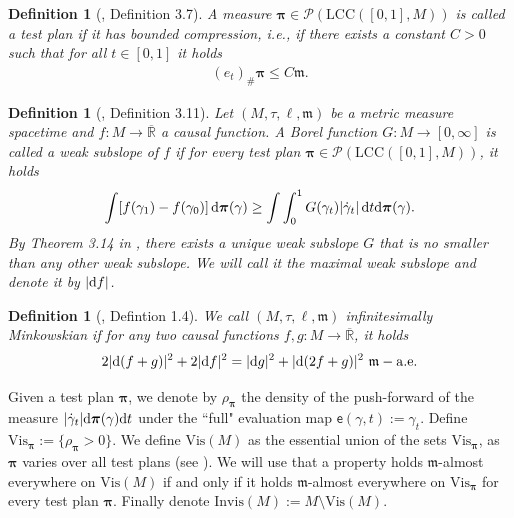 \documentclass[a4paper,10pt]{article}
\newtheorem{definition}[theorem]{Definition}
\numberwithin{equation}{section}
\newcommand{\R}{\mathbb{R}}
\newcommand{\di}{{\rm d}}
\begin{document}
\begin{definition}[\cite{beran2024nonlinear}, Definition 3.7]
    A measure $\boldsymbol{\pi} \in \mathcal{P}(\mathrm{LCC}([0,1], M))$ is called a \emph{test plan} if it has bounded compression, i.e., if there exists a constant $C>0$ such that for all $t \in [0,1]$ it holds 
    \begin{align*}
        (e_t)_\#\boldsymbol{\pi} \leq C \mathfrak{m}. 
    \end{align*}
\end{definition}

\smallskip
\begin{definition}[\cite{beran2024nonlinear}, Definition 3.11]\label{def:subslope}
    Let $(M, \tau, \ell, \mathfrak{m})$ be a metric measure spacetime and $f\colon M \to \overline{\R}$ a causal function. A Borel function $G\colon M \to [0, \infty]$ is called a \emph{weak subslope} of $f$ if for every test plan $\boldsymbol{\pi} \in \mathcal{P}(\mathrm{LCC}([0,1], M))$, it holds
    \begin{align}
        \int [f(\gamma_1)-f(\gamma_0)]\, \di \boldsymbol{\pi}(\gamma) \geq \int \int_0^1 G(\gamma_t)|\dot{\gamma}_t|\, \di t \di \boldsymbol{\pi}(\gamma).
    \end{align}
    By Theorem 3.14 in \cite{beran2024nonlinear}, there exists a unique weak subslope $G$ that is no smaller than any other weak subslope. We will call it the \emph{maximal weak subslope} and denote it by $|\di f|$.
\end{definition}

\smallskip
\begin{definition}[\cite{beran2024nonlinear}, Defintion 1.4]
    We call $(M,\tau, \ell, \mathfrak{m})$ \emph{infinitesimally Minkowskian} if for any two causal functions $f, g\colon  M \to \overline{\R}$, it holds
    \begin{align}\label{def:infinitesimal_minkowskianity}
        2|\di(f+g)|^2+ 2|\di f|^2 = |\di g|^2 + |\di (2f+g)|^2 \ \mathfrak{m}-\mathrm{a.e.}
    \end{align}
\end{definition}
Given a test plan $\boldsymbol{\pi}$, we denote by $\rho_{\boldsymbol{\pi}}$ the density of the push-forward of the measure $|\dot{\gamma}_t|\di\boldsymbol{\pi}(\gamma) \di t$ under the ``full" evaluation map $\mathsf{e}(\gamma, t) := \gamma_t$. Define $\mathrm{Vis}_{\boldsymbol{\pi}}:=\{\rho_{\boldsymbol{\pi}}>0\}$. We define $\mathrm{Vis}(M)$ as the essential union of the sets $\mathrm{Vis}_{\boldsymbol{\pi}}$, as $\boldsymbol{\pi}$ varies over all test plans (see \cite[Proposition 3.1.9]{gigli2020lectures}). 
We will use that a property holds $\mathfrak{m}$-almost everywhere on $\mathrm{Vis}(M)$ if and only if it holds $\mathfrak{m}$-almost everywhere on $\mathrm{Vis}_{\boldsymbol{\pi}}$ for every test plan $\boldsymbol{\pi}$. 
Finally denote $\mathrm{Invis}(M):= M\setminus \mathrm{Vis}(M)$.
\end{document}
